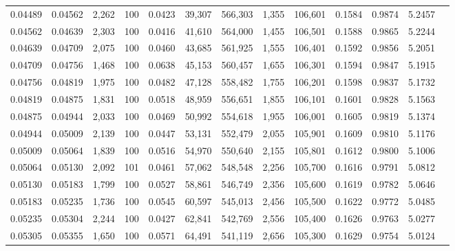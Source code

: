 \begin{tabular}{rrrrrrrrrrrrr}
0.04489 & 0.04562 & 2,262 & 100 &                                     0.0423 &  39,307 & 566,303 &   1,355 & 106,601 & 0.1584 & 0.9874 & 5.2457 \\
0.04562 & 0.04639 & 2,303 & 100 &                                     0.0416 &  41,610 & 564,000 &   1,455 & 106,501 & 0.1588 & 0.9865 & 5.2244 \\
0.04639 & 0.04709 & 2,075 & 100 &                                     0.0460 &  43,685 & 561,925 &   1,555 & 106,401 & 0.1592 & 0.9856 & 5.2051 \\
0.04709 & 0.04756 & 1,468 & 100 &                                     0.0638 &  45,153 & 560,457 &   1,655 & 106,301 & 0.1594 & 0.9847 & 5.1915 \\
0.04756 & 0.04819 & 1,975 & 100 &                                     0.0482 &  47,128 & 558,482 &   1,755 & 106,201 & 0.1598 & 0.9837 & 5.1732 \\
0.04819 & 0.04875 & 1,831 & 100 &                                     0.0518 &  48,959 & 556,651 &   1,855 & 106,101 & 0.1601 & 0.9828 & 5.1563 \\
0.04875 & 0.04944 & 2,033 & 100 &                                     0.0469 &  50,992 & 554,618 &   1,955 & 106,001 & 0.1605 & 0.9819 & 5.1374 \\
0.04944 & 0.05009 & 2,139 & 100 &                                     0.0447 &  53,131 & 552,479 &   2,055 & 105,901 & 0.1609 & 0.9810 & 5.1176 \\
0.05009 & 0.05064 & 1,839 & 100 &                                     0.0516 &  54,970 & 550,640 &   2,155 & 105,801 & 0.1612 & 0.9800 & 5.1006 \\
0.05064 & 0.05130 & 2,092 & 101 &                                     0.0461 &  57,062 & 548,548 &   2,256 & 105,700 & 0.1616 & 0.9791 & 5.0812 \\
0.05130 & 0.05183 & 1,799 & 100 &                                     0.0527 &  58,861 & 546,749 &   2,356 & 105,600 & 0.1619 & 0.9782 & 5.0646 \\
0.05183 & 0.05235 & 1,736 & 100 &                                     0.0545 &  60,597 & 545,013 &   2,456 & 105,500 & 0.1622 & 0.9772 & 5.0485 \\
0.05235 & 0.05304 & 2,244 & 100 &                                     0.0427 &  62,841 & 542,769 &   2,556 & 105,400 & 0.1626 & 0.9763 & 5.0277 \\
0.05305 & 0.05355 & 1,650 & 100 &                                     0.0571 &  64,491 & 541,119 &   2,656 & 105,300 & 0.1629 & 0.9754 & 5.0124 \\

\end{tabular}
